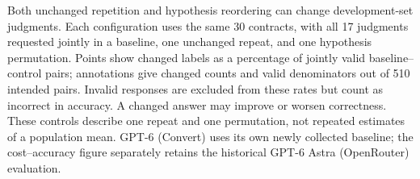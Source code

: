 Both unchanged repetition and hypothesis reordering can change development-set judgments. Each configuration uses the same 30 contracts, with all 17 judgments requested jointly in a baseline, one unchanged repeat, and one hypothesis permutation. Points show changed labels as a percentage of jointly valid baseline--control pairs; annotations give changed counts and valid denominators out of 510 intended pairs. Invalid responses are excluded from these rates but count as incorrect in accuracy. A changed answer may improve or worsen correctness. These controls describe one repeat and one permutation, not repeated estimates of a population mean. GPT-6 (Convert) uses its own newly collected baseline; the cost--accuracy figure separately retains the historical GPT-6 Astra (OpenRouter) evaluation.
